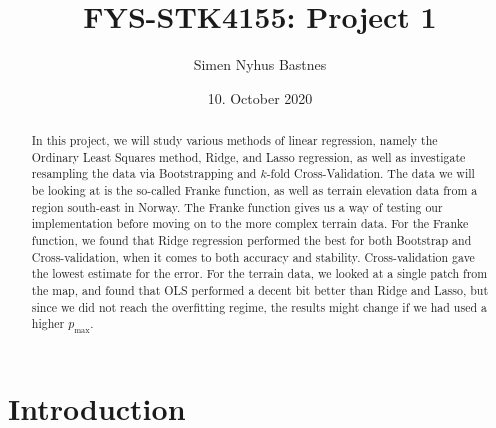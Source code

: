 \documentclass[a4paper]{article}
\title{FYS-STK4155: Project 1}
\author{Simen Nyhus Bastnes}
\date{10. October 2020}
\begin{document}
\maketitle
\begin{abstract}
In this project, we will study various methods of linear regression, namely the Ordinary Least Squares method, Ridge, and Lasso regression, as well as investigate resampling the data via Bootstrapping and $k$-fold Cross-Validation. The data we will be looking at is the so-called Franke function, as well as terrain elevation data from a region south-east in Norway. The Franke function gives us a way of testing our implementation before moving on to the more complex terrain data. For the Franke function, we found that Ridge regression performed the best for both Bootstrap and Cross-validation, when it comes to both accuracy and stability. Cross-validation gave the lowest estimate for the error. For the terrain data, we looked at a single patch from the map, and found that OLS performed a decent bit better than Ridge and Lasso, but since we did not reach the overfitting regime, the results might change if we had used a higher $p_{\text{max}}$.

\end{abstract}
\section{Introduction}
\end{document}
